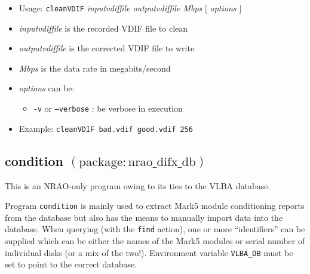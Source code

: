 \begin{itemize}
\item[] Usage: {\tt cleanVDIF} {\em inputvdiffile outputvdiffile Mbps} $[$ {\em options} $]$ 

\item[] {\em inputvdiffile} is the recorded VDIF file to clean
\item[] {\em outputvdiffile} is the corrected VDIF file to write
\item[] {\em Mbps} is the data rate in megabits/second
\item[] {\em options} can be:
\begin{itemize}
\item[] {\tt -v} or {\tt --verbose} : be verbose in execution
\end{itemize}

\item[] Example: {\tt cleanVDIF bad.vdif good.vdif 256}
\end{itemize}





\subsection{condition {\small $\mathrm{(package: nrao\_difx\_db)}$}}

This is an NRAO-only program owing to its ties to the VLBA database.

Program {\tt condition} is mainly used to extract Mark5 module conditioning reports from the database but also has the means to manually import data into the database.
When querying (with the {\tt find} action), one or more ``identifiers'' can be supplied which can be either the names of the Mark5 modules or serial number of individual disks (or a mix of the two!).
Environment variable {\tt VLBA\_DB} must be set to point to the correct database.

